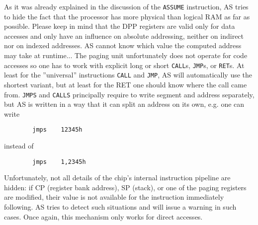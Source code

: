 \documentclass[12pt,twoside]{report}
\newcommand{\tty}[1]{{\tt #1}}
\begin{document}
As it was already explained in the discussion of the \tty{ASSUME}
instruction, AS tries to hide the fact that the processor has more
physical than logical RAM as far as possible.  Please keep in mind
that the DPP registers are valid only for data accesses and only
have an influence on absolute addressing, neither on indirect nor on indexed
addresses.  AS cannot know which value the computed address may take
at runtime...
The paging unit unfortunately does not operate for code accesses so
one has to work with explicit long or short \tty{CALL}s, \tty{JMP}s, or
\tty{RET}s.  At least for the ''universal'' instructions \tty{CALL} and
\tty{JMP}, AS will automatically use the shortest variant, but at least for the RET one
should know where the call came from.  \tty{JMPS} and \tty{CALLS} principally
require to write segment and address separately, but AS is written in
a way that it can split an address on its own, e.g. one can write
\begin{verbatim}
        jmps    12345h
\end{verbatim}
instead of
\begin{verbatim}
        jmps    1,2345h
\end{verbatim}
Unfortunately, not all details of the chip's internal instruction
pipeline are hidden: if CP (register bank address), SP (stack), or
one of the paging registers are modified, their value is not
available for the instruction immediately following.  AS tries to
detect such situations and will issue a warning in such cases.  Once
again, this mechanism only works for direct accesses.
\end{document}
